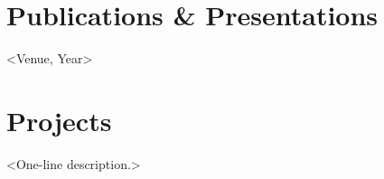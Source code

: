 \documentclass{resume}
\begin{document}
\section*{Publications \& Presentations}
            {<Venue, Year>}

\section*{Projects}
<One-line description.>
\end{document}
